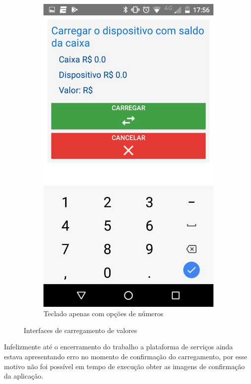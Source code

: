 \documentclass[hidelinks,12pt]{article}
\begin{document}
\begin{figure}[H]
\begin{subfigure}{0.5\textwidth}
		\includegraphics[scale=0.3]{charge}
		\caption{Teclado apenas com op\c{c}\~oes de n\'umeros}
		\label{charge_numbers}
	\end{subfigure}
	\caption{Interfaces de carregamento de valores}
	\label{charge_s}
\end{figure}

Infelizmente at\'e o encerramento do trabalho a plataforma de servi\c{c}os ainda estava apresentando erro no momento de confirma\c{c}\~ao do carregamento, por esse motivo n\~ao foi poss\'ivel em tempo de execu\c{c}\~ao obter as imagens de confirma\c{c}\~ao da aplica\c{c}\~ao.
\end{document}
